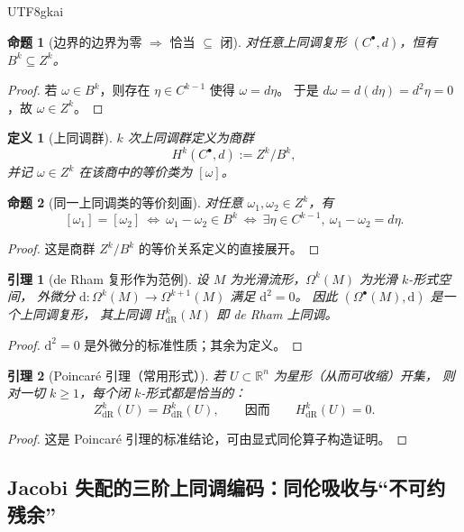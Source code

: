 \documentclass[12pt]{article}
\newtheorem{definition}{定义}[section]
\newtheorem{proposition}{命题}[section]
\newtheorem{lemma}{引理}[section]
\begin{document}
\begin{CJK*}{UTF8}{gkai}
\begin{proposition}[边界的边界为零 $\Rightarrow$ 恰当 $\subseteq$ 闭]\label{prop:A-exact-subset-closed}
对任意上同调复形 $(C^\bullet,d)$，恒有 $B^k\subseteq Z^k$。
\end{proposition}
\begin{proof}
若 $\omega\in B^k$，则存在 $\eta\in C^{k-1}$ 使得 $\omega=d\eta$。
于是 $d\omega=d(d\eta)=d^2\eta=0$，故 $\omega\in Z^k$。
\end{proof}

\begin{definition}[上同调群]\label{def:A-cohomology}
$k$ 次上同调群定义为商群
\[
  H^k(C^\bullet,d):=Z^k/B^k,
\]
并记 $\omega\in Z^k$ 在该商中的等价类为 $[\omega]$。
\end{definition}

\begin{proposition}[同一上同调类的等价刻画]\label{prop:A-cohomology-class}
对任意 $\omega_1,\omega_2\in Z^k$，有
\[
  [\omega_1]=[\omega_2]
  \ \Longleftrightarrow\
  \omega_1-\omega_2\in B^k
  \ \Longleftrightarrow\
  \exists \eta\in C^{k-1},\ \omega_1-\omega_2=d\eta.
\]
\end{proposition}
\begin{proof}
这是商群 $Z^k/B^k$ 的等价关系定义的直接展开。
\end{proof}

\begin{lemma}[de Rham 复形作为范例]\label{lem:A-derham}
设 $M$ 为光滑流形，$\Omega^k(M)$ 为光滑 $k$-形式空间，
外微分 $\mathrm{d}:\Omega^k(M)\to\Omega^{k+1}(M)$ 满足 $\mathrm{d}^2=0$。
因此 $(\Omega^\bullet(M),\mathrm{d})$ 是一个上同调复形，
其上同调 $H^k_{\mathrm{dR}}(M)$ 即 de Rham 上同调。
\end{lemma}
\begin{proof}
$\mathrm{d}^2=0$ 是外微分的标准性质；其余为定义。
\end{proof}

\begin{lemma}[Poincaré 引理（常用形式）]\label{lem:A-poincare}
若 $U\subset\mathbb{R}^n$ 为星形（从而可收缩）开集，
则对一切 $k\ge1$，每个闭 $k$-形式都是恰当的：
\[
  Z^k_{\mathrm{dR}}(U)=B^k_{\mathrm{dR}}(U),
  \qquad\text{因而}\qquad
  H^k_{\mathrm{dR}}(U)=0.
\]
\end{lemma}
\begin{proof}
这是 Poincaré 引理的标准结论，可由显式同伦算子构造证明。
\end{proof}

\subsection{Jacobi 失配的三阶上同调编码：同伦吸收与“不可约残余”}


\end{CJK*}
\end{document}
